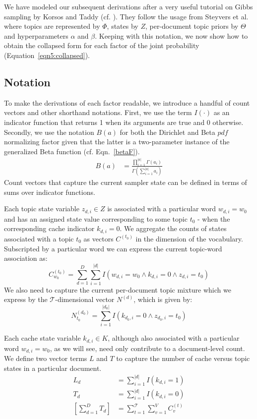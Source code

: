We have modeled our subsequent derivations after a very useful tutorial on Gibbs sampling by Korsos and Taddy (cf. \cite{korsos2011gibbs}).  They follow the usage from Steyvers et al. where topics are represented by $\Phi$, states by $Z$, per-document topic priors by $\Theta$ and hyperparameters $\alpha$ and $\beta$.   Keeping with this notation, we now show how to obtain the collapsed form for each factor of the joint probability (Equation~\ref{eqn5:collapsed}).  

\subsection{Notation}
To make the derivations of each factor readable, we introduce a handful of count vectors and other shorthand notations.  First, we use the term $I(\cdot)$ as an indicator function that returns 1 when its arguments are true and 0 otherwise.  Secondly, we use the notation $B(a)$ for both the Dirichlet and Beta $pdf$ normalizing factor given that the latter is a two-parameter instance of the generalized Beta function (cf. Eqn.~\ref{betaF}).
\begin{align}
B(a) &= \frac{\prod_{i=1}^{|a|}\Gamma(a_i)}{\Gamma(\sum_{i=1}^{|a|}a_i)} \label{betaF}
\end{align}
\noindent Count vectors that capture the current sampler state can be defined in terms of sums over indicator functions.

Each topic state variable $z_{d,i}\in Z$ is associated with a particular word $w_{d,i}=w_0$ and has an assigned state value corresponding to some topic $t_0$ - when the corresponding cache indicator $k_{d,i}=0$.  We aggregate the counts of states associated with a topic $t_0$ as vectors $C^{(t_0)}$ in the dimension of the vocabulary.  Subscripted by a particular word we can express the current topic-word association as:
\begin{equation}
	C^{(t_0)}_{w_0} = \sum_{d=1}^D \sum_{i=1}^{|d|} I(w_{d,i}=w_0 \land k_{d,i}=0 \land z_{d,i}=t_0)
\end{equation}
\noindent We also need to capture the current per-document topic mixture which we express by the $\mathcal{T}$-dimensional vector $N^{(d)}$, which is given by:
\begin{equation}
	N^{(d_0)}_{t_0} = \sum_{i=1}^{|d_0|} I(k_{d_0,i}=0 \land z_{d_0,i}=t_0)
\end{equation}

Each cache state variable $k_{d,i}\in K$, although also associated with a particular word $w_{d,i}=w_0$, as we will see, need only contribute to a document-level count. We define two vector terms $L$ and $T$ to capture the number of cache versus topic states in a particular document.
\begin{align}
	L_d &= \sum_{i=1}^{|d|} I(k_{d,i}=1) \\
	T_d &= \sum_{i=1}^{|d|} I(k_{d,i}=0) \\
	 \left[ \sum_{d=1}^D T_d\right]&= \sum_{t=1}^{\mathcal{T}} \sum_{v=1}^V C^{(t)}_{v}
\end{align}

